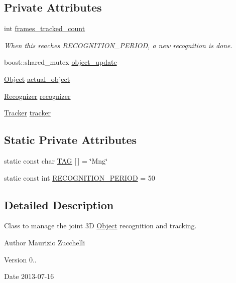 \subsection*{Private Attributes}
\begin{DoxyCompactItemize}
\item 
int \hyperlink{class_i_stuff_1_1_manager_a3cacb02ece1a4938e7754ad553c91a74}{frames\-\_\-tracked\-\_\-count}
\begin{DoxyCompactList}\small\item\em When this reaches R\-E\-C\-O\-G\-N\-I\-T\-I\-O\-N\-\_\-\-P\-E\-R\-I\-O\-D, a new recognition is done. \end{DoxyCompactList}\item 
boost\-::shared\-\_\-mutex \hyperlink{class_i_stuff_1_1_manager_a9b4234320a01a049bc10f9f13d612fc4}{object\-\_\-update}
\item 
\hyperlink{class_i_stuff_1_1_object}{Object} \hyperlink{class_i_stuff_1_1_manager_a9b898107c919a3ba73f60278c9c05742}{actual\-\_\-object}
\item 
\hyperlink{class_i_stuff_1_1_recognizer}{Recognizer} \hyperlink{class_i_stuff_1_1_manager_ac039aa2e611b04595e4ff69d3534b4cc}{recognizer}
\item 
\hyperlink{class_i_stuff_1_1_tracker}{Tracker} \hyperlink{class_i_stuff_1_1_manager_a3d313f62a1cfe606098fdcb6f1c748ee}{tracker}
\end{DoxyCompactItemize}
\subsection*{Static Private Attributes}
\begin{DoxyCompactItemize}
\item 
static const char \hyperlink{class_i_stuff_1_1_manager_a0228682f317a86ce7057b86e9d229ac6}{T\-A\-G} \mbox{[}$\,$\mbox{]} = \char`\"{}Mng\char`\"{}
\item 
static const int \hyperlink{class_i_stuff_1_1_manager_a58f0beb39eea21e78a8983e5954065c3}{R\-E\-C\-O\-G\-N\-I\-T\-I\-O\-N\-\_\-\-P\-E\-R\-I\-O\-D} = 50
\end{DoxyCompactItemize}


\subsection{Detailed Description}
Class to manage the joint 3\-D \hyperlink{class_i_stuff_1_1_object}{Object} recognition and tracking. 

\begin{DoxyAuthor}{Author}
Maurizio Zucchelli 
\end{DoxyAuthor}
\begin{DoxyVersion}{Version}
0.. 
\end{DoxyVersion}
\begin{DoxyDate}{Date}
2013-\/07-\/16 
\end{DoxyDate}


